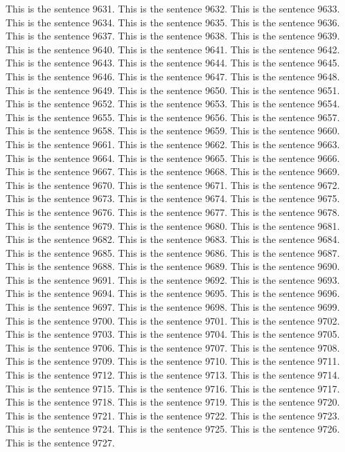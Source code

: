 \documentclass{article}
\begin{document}
This is the sentence 9631.
This is the sentence 9632.
This is the sentence 9633.
This is the sentence 9634.
This is the sentence 9635.
This is the sentence 9636.
This is the sentence 9637.
This is the sentence 9638.
This is the sentence 9639.
This is the sentence 9640.
This is the sentence 9641.
This is the sentence 9642.
This is the sentence 9643.
This is the sentence 9644.
This is the sentence 9645.
This is the sentence 9646.
This is the sentence 9647.
This is the sentence 9648.
This is the sentence 9649.
This is the sentence 9650.
This is the sentence 9651.
This is the sentence 9652.
This is the sentence 9653.
This is the sentence 9654.
This is the sentence 9655.
This is the sentence 9656.
This is the sentence 9657.
This is the sentence 9658.
This is the sentence 9659.
This is the sentence 9660.
This is the sentence 9661.
This is the sentence 9662.
This is the sentence 9663.
This is the sentence 9664.
This is the sentence 9665.
This is the sentence 9666.
This is the sentence 9667.
This is the sentence 9668.
This is the sentence 9669.
This is the sentence 9670.
This is the sentence 9671.
This is the sentence 9672.
This is the sentence 9673.
This is the sentence 9674.
This is the sentence 9675.
This is the sentence 9676.
This is the sentence 9677.
This is the sentence 9678.
This is the sentence 9679.
This is the sentence 9680.
This is the sentence 9681.
This is the sentence 9682.
This is the sentence 9683.
This is the sentence 9684.
This is the sentence 9685.
This is the sentence 9686.
This is the sentence 9687.
This is the sentence 9688.
This is the sentence 9689.
This is the sentence 9690.
This is the sentence 9691.
This is the sentence 9692.
This is the sentence 9693.
This is the sentence 9694.
This is the sentence 9695.
This is the sentence 9696.
This is the sentence 9697.
This is the sentence 9698.
This is the sentence 9699.
This is the sentence 9700.
This is the sentence 9701.
This is the sentence 9702.
This is the sentence 9703.
This is the sentence 9704.
This is the sentence 9705.
This is the sentence 9706.
This is the sentence 9707.
This is the sentence 9708.
This is the sentence 9709.
This is the sentence 9710.
This is the sentence 9711.
This is the sentence 9712.
This is the sentence 9713.
This is the sentence 9714.
This is the sentence 9715.
This is the sentence 9716.
This is the sentence 9717.
This is the sentence 9718.
This is the sentence 9719.
This is the sentence 9720.
This is the sentence 9721.
This is the sentence 9722.
This is the sentence 9723.
This is the sentence 9724.
This is the sentence 9725.
This is the sentence 9726.
This is the sentence 9727.
\end{document}
